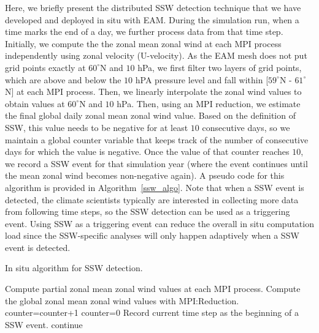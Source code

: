 \documentclass{juliacon}
\begin{document}
Here, we briefly present the distributed SSW detection technique that we have developed and deployed in situ with EAM. During the simulation run, when a time marks the end of a day, we further process data from that time step. Initially, we compute the the zonal mean zonal wind at each MPI process independently using zonal velocity (U-velocity). As the EAM mesh does not put grid points exactly at $60^{\circ}$N and $10$ hPa, we first filter two layers of grid points, which are above and below the $10$ hPA pressure level and fall within [$59^{\circ}$N - $61^{\circ}$N] at each MPI process. Then, we linearly interpolate the zonal wind values to obtain values at $60^{\circ}$N and $10$ hPa. Then, using an MPI reduction, we estimate the final global daily zonal mean zonal wind value. Based on the definition of SSW, this value needs to be negative for at least $10$ consecutive days, so we maintain a global counter variable that keeps track of the number of consecutive days for which the value is negative. Once the value of that counter reaches $10$, we record a SSW event for that simulation year (where the event continues until the mean zonal wind becomes non-negative again). A pseudo code for this algorithm is provided in Algorithm~\ref{ssw_algo}. Note that when a SSW event is detected, the climate scientists typically are interested in collecting more data from following time steps, so the SSW detection can be used as a triggering event. Using SSW as a triggering event can reduce the overall in situ computation load since the SSW-specific analyses will only happen adaptively when a SSW event is detected.


\begin{algorithm}
\caption{In situ algorithm for SSW detection.}\label{ssw_algo}
\begin{algorithmic}[1]
\Statex
{}
    \State Compute partial zonal mean zonal wind values
    \State at each MPI process.
    \State Compute the global zonal mean zonal wind
    \State values with MPI:Reduction.
    \State counter=counter+1
    \Else
    \State counter=0
    \EndIf
    \State Record current time step as the beginning of
    \State a SSW event.
    \EndIf
  \Else
    \State continue
  \EndIf
\EndFor
\end{algorithmic}
\end{algorithm}
\end{document}
